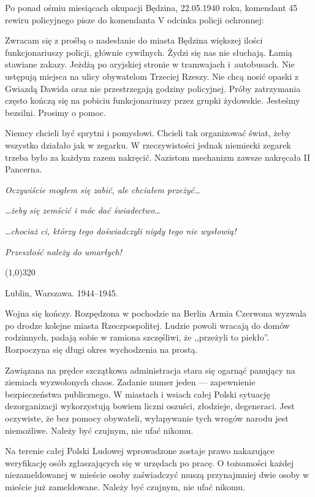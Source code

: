 \documentclass[11pt,a4paper,oneside]{article}
\begin{document}
Po ponad ośmiu miesiącach okupacji Będzina, 22.05.1940 roku, komendant
45 rewiru policyjnego pisze do komendanta V odcinka policji 
ochronnej:

Zwracam się z prośbą o nadesłanie do miasta Będzina większej ilości
funkcjonariuszy policji, głównie cywilnych.  Żydzi się nas nie
słuchają. Łamią stawiane zakazy. Jeżdżą po aryjskiej stronie
w tramwajach i~autobusach. Nie ustępują miejsca na ulicy obywatelom
Trzeciej Rzeszy. Nie chcą nosić opaski z Gwiazdą Dawida oraz nie
przestrzegają godziny policyjnej. Próby zatrzymania często kończą się
na pobiciu funkcjonariuszy przez grupki żydowskie.  Jesteśmy bezsilni.
Prosimy o pomoc.

Niemcy chcieli być sprytni i pomysłowi. Chcieli tak organizować świat,
żeby wszystko działało jak w zegarku. W rzeczywistości jednak
niemiecki zegarek trzeba było za każdym razem nakręcić. Nazistom
mechanizm zawsze nakręcała II Pancerna. 

\emph{Oczywiście mogłem się zabić, ale chciałem przeżyć\dots{}} 

\emph{\dots{}żeby się zemścić i móc dać świadectwo\dots{}}

\emph{\dots{}chociaż ci, którzy tego doświadczyli nigdy tego nie wysłowią!}

\emph{Przeszłość należy do umarłych!}

\line(1,0){320}

Lublin, Warszawa. 1944--1945. %

Wojna się kończy. Rozpędzona w pochodzie na Berlin Armia Czerwona
wyzwala po drodze kolejne miasta Rzeczpospolitej. Ludzie powoli
wracają do domów rodzinnych, padają sobie w ramiona szczęśliwi, że
,,przeżyli to piekło''. Rozpoczyna się długi okres wychodzenia na
prostą.

Zawiązana na prędce szczątkowa administracja stara się ogarnąć
panujący na ziemiach wyzwolonych chaos. Zadanie numer jeden ---
zapewnienie bezpieczeństwa publicznego. W miastach i wsiach całej
Polski sytuację dezorganizacji wykorzystują bowiem liczni oszuści,
złodzieje, degeneraci. Jest oczywiste, że bez pomocy obywateli,
wyłapywanie tych wrogów narodu jest niemożliwe. Należy być czujnym,
nie ufać nikomu.

Na terenie całej Polski Ludowej wprowadzone zostaje prawo nakazujące
weryfikację osób zgłaszających się w urzędach po pracę. O tożsamości
każdej niezameldowanej w mieście osoby zaświadczyć muszą przynajmniej
dwie osoby w mieście już zameldowane. Należy być czujnym, nie ufać
nikomu. 
\end{document}
